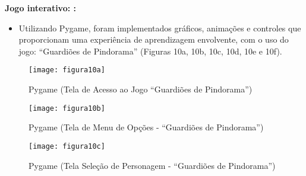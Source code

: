                                                     \item \textbf{Jogo interativo: :}
                                                    \begin{itemize}[leftmargin=2em]
                                                        \item Utilizando Pygame, foram implementados gráficos, animações e controles que proporcionam uma experiência de aprendizagem envolvente, com o uso do jogo: “Guardiões de Pindorama” (Figuras 10a, 10b, 10c, 10d, 10e e 10f). 
                                                    \end{itemize}

                                                    \begin{figure}[!h]
                                                        \centering
                                                        \caption{ Pygame (Tela de Acesso ao Jogo “Guardiões de Pindorama”)   }%
                                                        \label{fig:figura10a}
                                                        \texttt{[image: figura10a]}
                                                        \end{figure}
                                
                                                        \begin{figure}[!h]
                                                            \centering
                                                            \caption{ Pygame (Tela de Menu de Opções - “Guardiões de Pindorama”)   }%
                                                            \label{fig:figura10b}
                                                            \texttt{[image: figura10b]}
                                                            \end{figure}
                                
                                
                                                            \begin{figure}[!h]
                                                                \centering
                                                                \caption{ Pygame (Tela Seleção de Personagem - “Guardiões de Pindorama”)  }%
                                                                \label{fig:figura10c}
                                                                \texttt{[image: figura10c]}
                                                                \end{figure}
                                
